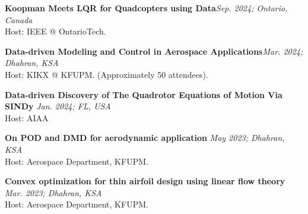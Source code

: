 \textbf{Koopman Meets LQR for Quadcopters using Data}\hfill {\textit{Sep. 2024; Ontario, Canada}}\\
Host: IEEE @ OntarioTech.
\vspace{0.1cm}

\textbf{Data-driven Modeling and Control in Aerospace Applications}\hfill {\textit{Mar. 2024; Dhahran, KSA}}\\
Host: KIKX @ KFUPM. (Approximately 50 attendees).
\vspace{0.1cm}

\textbf{Data-driven Discovery of The Quadrotor Equations of Motion Via SINDy} \hfill {\textit{Jan. 2024; FL, USA}}\\
Host: AIAA
\vspace{0.1cm}

\textbf{On POD and DMD for aerodynamic application} \hfill {\textit{May 2023; Dhahran, KSA}}\\
Host: Aerospace Department, KFUPM.
\vspace{0.1cm}

\textbf{Convex optimization for thin airfoil design using linear flow theory} \hfill {\textit{Mar. 2023; Dhahran, KSA}}\\
Host: Aerospace Department, KFUPM.